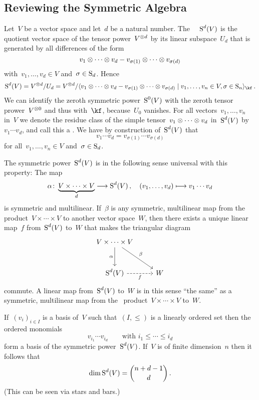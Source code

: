 \subsection{Reviewing the Symmetric Algebra}


\begin{recall}
	Let~$V$ be a vector space and let~$d$ be a natural number.
	The~{} ~$\operatorname{S}^d(V)$ is the quotient vector space of the tensor power~$V^{\otimes d}$ by its linear subspace~$U_d$ that is generated by all differences of the form
	\[
			v_1 \otimes \dotsb \otimes v_d
		- v_{\sigma(1)} \otimes \dotsb \otimes v_{\sigma(d)}
	\]
	with~$v_1, \dotsc, v_d \in V$ and~$\sigma \in \operatorname{S}_d$.
	Hence
	\[
		\Symm^d(V)
		=
		V^{\tensor d} / U_d
		=
		V^{\tensor d}
		/
		\gen{
				v_1 \tensor \dotsb \tensor v_d
			- v_{\sigma(1)} \tensor \dotsb \tensor v_{\sigma(d)} 
		\suchthat
			v_1, \dotsc, v_n \in V,
			\sigma \in \symm_n
		}_{\kf} \,.
	\]
	We can identify the zeroth symmetric power~$\operatorname{S}^0(V)$ with the zeroth tensor prower~$V^{\otimes 0}$ and thus with~$\kf$, because~$U_0$ vanishes.
	For all vectors~$v_1, \dotsc, v_n$ in~$V$ we denote the residue class of the simple tensor~$v_1 \otimes \dotsb \otimes v_d$ in~$\operatorname{S}^d(V)$ by~$v_1 \dotsm v_d$, and call this a .
	We have by construction of~$\operatorname{S}^d(V)$ that
	\[
		v_1 \dotsm v_d
		=
		v_{\sigma(1)} \dotsm v_{\sigma(d)}
	\]
	for all~$v_1, \dotsc, v_n \in V$ and~$\sigma \in \operatorname{S}_d$.

	The symmetric power~$\operatorname{S}^d(V)$ is in the following sense universal with this property:
	The map
	\[
		\alpha
		\colon
		\underbrace{ V \times \dotsb \times V }_d
		\to
		\Symm^d(V)  \,,
		\quad
		(v_1, \dotsc, v_d)
		\mapsto
		v_1 \dotsm v_d
	\]
	is symmetric and multilinear.
	If~$\beta$ is any symmetric, multilinear map from the~ product~$V \times \dotsb \times V$ to another vector space~$W$, then there exists a unique linear map~$f$ from~$\operatorname{S}^d(V)$ to~$W$ that makes the triangular diagram
	\[
		\begin{tikzcd}[row sep = large]
			V \times \dotsb \times V
			\arrow{d}[left]{\alpha}
			\arrow{dr}[above right]{\beta}
			&
			{}
			\\
			\Symm^d(V)
			\arrow[dashed]{r}[below]{f}
			&
			W
		\end{tikzcd}
	\]
	commute.
	A linear map from~$\operatorname{S}^d(V)$ to~$W$ is in this sense \enquote{the same} as a symmetric, multilinear map from the~ product~$V \times \dotsb \times V$ to~$W$.
	
	If~$(v_i)_{i \in I}$ is a basis of~$V$ such that~$(I, \leq)$ is a linearly ordered set then the ordered monomials
	\[
		v_{i_1} \dotsm v_{i_d}
		\qquad
		\text{with~$i_1 \leq \dotsb \leq i_d$}
	\]
	form a basis of the symmetric power~$\operatorname{S}^d(V)$.
	If~$V$ is of finite dimension~$n$ then it follows that
	\[
		\dim \operatorname{S}^d(V)
		=
		\binom{n+d-1}{d}  \,.
	\]
	(This can be seen via stars and bars.)
\end{recall}


